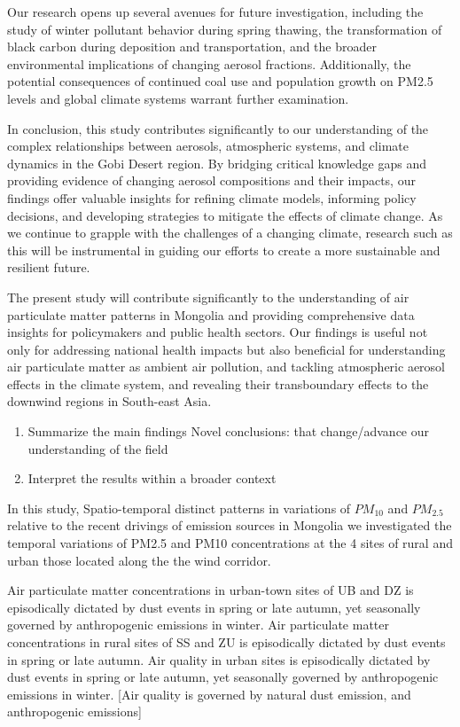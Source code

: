 \documentclass[
  11pt,
]{article}
\providecommand{\tightlist}{%
  \setlength{\itemsep}{0pt}\setlength{\parskip}{0pt}}
\begin{document}
Our research opens up several avenues for future investigation,
including the study of winter pollutant behavior during spring thawing,
the transformation of black carbon during deposition and transportation,
and the broader environmental implications of changing aerosol
fractions. Additionally, the potential consequences of continued coal
use and population growth on PM2.5 levels and global climate systems
warrant further examination.

In conclusion, this study contributes significantly to our understanding
of the complex relationships between aerosols, atmospheric systems, and
climate dynamics in the Gobi Desert region. By bridging critical
knowledge gaps and providing evidence of changing aerosol compositions
and their impacts, our findings offer valuable insights for refining
climate models, informing policy decisions, and developing strategies to
mitigate the effects of climate change. As we continue to grapple with
the challenges of a changing climate, research such as this will be
instrumental in guiding our efforts to create a more sustainable and
resilient future.

The present study will contribute significantly to the understanding of
air particulate matter patterns in Mongolia and providing comprehensive
data insights for policymakers and public health sectors. Our findings
is useful not only for addressing national health impacts but also
beneficial for understanding air particulate matter as ambient air
pollution, and tackling atmospheric aerosol effects in the climate
system, and revealing their transboundary effects to the downwind
regions in South-east Asia.

\begin{enumerate}
\def\labelenumi{\arabic{enumi}.}
\setcounter{enumi}{1}
\tightlist
\item
  Summarize the main findings Novel conclusions: that change/advance our
  understanding of the field
\item
  Interpret the results within a broader context
\end{enumerate}

In this study, Spatio-temporal distinct patterns in variations of
\(PM_{10}\) and \(PM_{2.5}\) relative to the recent drivings of emission
sources in Mongolia we investigated the temporal variations of PM2.5 and
PM10 concentrations at the 4 sites of rural and urban those located
along the the wind corridor.

Air particulate matter concentrations in urban-town sites of UB and DZ
is episodically dictated by dust events in spring or late autumn, yet
seasonally governed by anthropogenic emissions in winter. Air
particulate matter concentrations in rural sites of SS and ZU is
episodically dictated by dust events in spring or late autumn. Air
quality in urban sites is episodically dictated by dust events in spring
or late autumn, yet seasonally governed by anthropogenic emissions in
winter. {[}Air quality is governed by natural dust emission, and
anthropogenic emissions{]}
\end{document}
